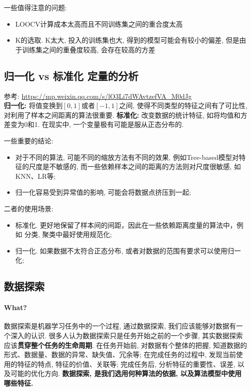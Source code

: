 一些值得注意的问题: 
\begin{itemize}
	\item LOOCV计算成本太高而且不同训练集之间的重合度太高
	\item K的选取. K太大, 投入的训练集也大, 得到的模型可能会有较小的偏差, 但是由于训练集之间的重叠度较高, 会存在较高的方差
\end{itemize}

\subsection{归一化 vs 标准化 定量的分析}
参考: \href{https://mp.weixin.qq.com/s/lO3Li7dWAvtzefVA_M0dJg}{https://mp.weixin.qq.com/s/lO3Li7dWAvtzefVA\_M0dJg}\\
\textbf{归一化: }将值变换到$[0, 1]$或者$[-1, 1]$之间, 使得不同类型的特征之间有了可比性, 对利用了样本之间距离的算法很重要. \textbf{标准化: }改变数据的统计特征, 如将均值和方差变为0和1. 在现实中, 一个变量极有可能是服从正态分布的. 


一些重要的结论: 
\begin{itemize}
	\item 对于不同的算法, 可能不同的缩放方法有不同的效果, 例如Tree-based模型对特征的尺度是不敏感的, 而一些依赖样本之间的距离的方法则对尺度很敏感, 如KNN、LR等; 
	
	\item 归一化容易受到异常值的影响, 可能会将数据点挤压到一起; 
\end{itemize}

二者的使用场景:
\begin{itemize}
	\item 标准化. 更好地保留了样本间的间距，因此在一些依赖距离度量的算法中，例如 分类, 聚类中最好使用规范化;
	
	\item 归一化. 如果数据不太符合正态分布, 或者对数据的范围有要求可以使用归一化;
\end{itemize}

\subsection{数据探索}
\paragraph{What?}数据探索是机器学习任务中的一个过程, 通过数据探索, 我们应该能够对数据有一个深入的认识. 很多人认为数据探索只是任务开始之前的一个步骤, 其实数据探索应该\textbf{贯穿整个任务的生命周期}. 在任务开始前, 对数据有个整体的把握, 知道数据的形式、数据量、数据的异常、缺失值、冗余等; 在完成任务的过程中, 发现当前使用的特征的特点, 特征的价值、关联等; 完成任务后, 分析特征的重要性、误差, 以及可能的优化方向. \textbf{数据探索, 是我们选用何种算法的依据, 以及算法模型中使用哪些特征. }

